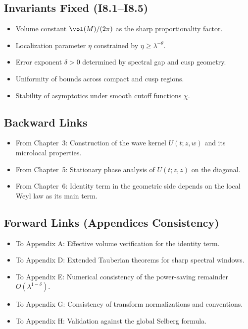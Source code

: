 \subsection*{Invariants Fixed (I8.1–I8.5)}
\begin{itemize}
  \item[(I8.1)] Volume constant $\vol(M)/(2\pi)$ as the sharp proportionality factor.
  \item[(I8.2)] Localization parameter $\eta$ constrained by $\eta \ge \lambda^{-\theta}$.
  \item[(I8.3)] Error exponent $\delta>0$ determined by spectral gap and cusp geometry.
  \item[(I8.4)] Uniformity of bounds across compact and cusp regions.
  \item[(I8.5)] Stability of asymptotics under smooth cutoff functions $\chi$.
\end{itemize}

\subsection*{Backward Links}
\begin{itemize}
  \item From Chapter~3: Construction of the wave kernel $U(t;z,w)$ and its microlocal properties.
  \item From Chapter~5: Stationary phase analysis of $U(t;z,z)$ on the diagonal.
  \item From Chapter~6: Identity term in the geometric side depends on the local Weyl law as its main term.
\end{itemize}

\subsection*{Forward Links (Appendices Consistency)}
\begin{itemize}
  \item To Appendix A: Effective volume verification for the identity term.
  \item To Appendix D: Extended Tauberian theorems for sharp spectral windows.
  \item To Appendix E: Numerical consistency of the power-saving remainder $O(\lambda^{1-\delta})$.
  \item To Appendix G: Consistency of transform normalizations and conventions.
  \item To Appendix H: Validation against the global Selberg formula.
\end{itemize}

